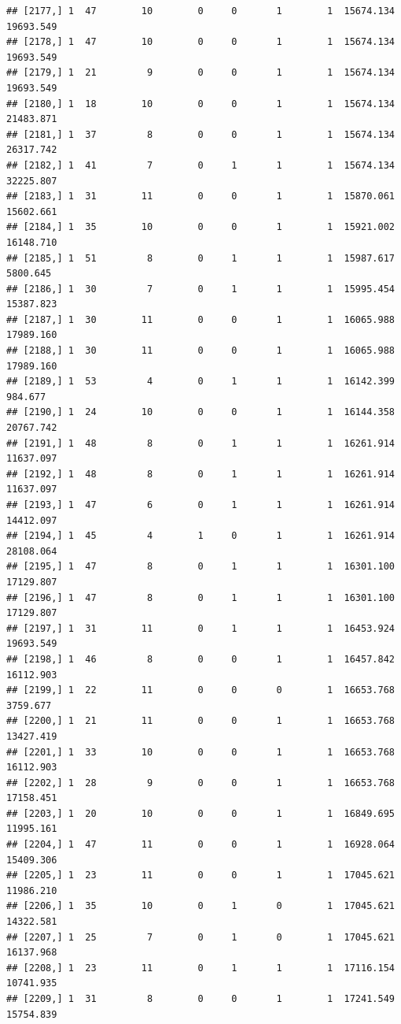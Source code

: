 \documentclass[
]{article}
\begin{document}
\begin{verbatim}
## [2177,] 1  47        10        0     0       1        1  15674.134  19693.549
## [2178,] 1  47        10        0     0       1        1  15674.134  19693.549
## [2179,] 1  21         9        0     0       1        1  15674.134  19693.549
## [2180,] 1  18        10        0     0       1        1  15674.134  21483.871
## [2181,] 1  37         8        0     0       1        1  15674.134  26317.742
## [2182,] 1  41         7        0     1       1        1  15674.134  32225.807
## [2183,] 1  31        11        0     0       1        1  15870.061  15602.661
## [2184,] 1  35        10        0     0       1        1  15921.002  16148.710
## [2185,] 1  51         8        0     1       1        1  15987.617   5800.645
## [2186,] 1  30         7        0     1       1        1  15995.454  15387.823
## [2187,] 1  30        11        0     0       1        1  16065.988  17989.160
## [2188,] 1  30        11        0     0       1        1  16065.988  17989.160
## [2189,] 1  53         4        0     1       1        1  16142.399    984.677
## [2190,] 1  24        10        0     0       1        1  16144.358  20767.742
## [2191,] 1  48         8        0     1       1        1  16261.914  11637.097
## [2192,] 1  48         8        0     1       1        1  16261.914  11637.097
## [2193,] 1  47         6        0     1       1        1  16261.914  14412.097
## [2194,] 1  45         4        1     0       1        1  16261.914  28108.064
## [2195,] 1  47         8        0     1       1        1  16301.100  17129.807
## [2196,] 1  47         8        0     1       1        1  16301.100  17129.807
## [2197,] 1  31        11        0     1       1        1  16453.924  19693.549
## [2198,] 1  46         8        0     0       1        1  16457.842  16112.903
## [2199,] 1  22        11        0     0       0        1  16653.768   3759.677
## [2200,] 1  21        11        0     0       1        1  16653.768  13427.419
## [2201,] 1  33        10        0     0       1        1  16653.768  16112.903
## [2202,] 1  28         9        0     0       1        1  16653.768  17158.451
## [2203,] 1  20        10        0     0       1        1  16849.695  11995.161
## [2204,] 1  47        11        0     0       1        1  16928.064  15409.306
## [2205,] 1  23        11        0     0       1        1  17045.621  11986.210
## [2206,] 1  35        10        0     1       0        1  17045.621  14322.581
## [2207,] 1  25         7        0     1       0        1  17045.621  16137.968
## [2208,] 1  23        11        0     1       1        1  17116.154  10741.935
## [2209,] 1  31         8        0     0       1        1  17241.549  15754.839

\end{verbatim}
\end{document}

